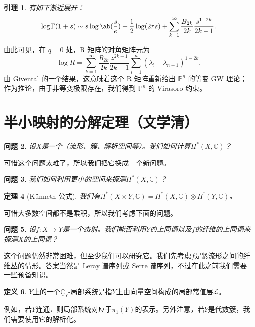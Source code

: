 \documentclass{amsart}
\newtheorem{thm}{定理}[section]
\newtheorem{lem}[thm]{引理}
\newtheorem{quest}[thm]{问题}
\theoremstyle{definition}
\newtheorem{defn}[thm]{定义}
\theoremstyle{remark}
\theoremstyle{plain}
\theoremstyle{definition}
\theoremstyle{remark}
\newcommand{\C}{\mathbb{C}}
\renewcommand{\P}{\mathbb{P}}
\newcommand{\mc}[1]{\mathcal{#1}}
\newcommand{\ul}[1]{\underline{#1}}
\newcommand{\1}{\mathbf{1}}
\newcommand{\2}{\mathbf{2}}
\newcommand{\3}{\mathbf{3}}
\begin{document}
\begin{lem}
    有如下渐近展开：
    \[ \log \Gamma(1+s) \sim s \log \ab(\frac{s}{e}) + \frac{1}{2} \log(2\pi s) + \sum_{k=1}^{\infty} \frac{B_{2k}}{2k} \frac{s^{1-2k}}{2k-1}. \]
\end{lem}
由此可见，在 \(q = 0\) 处，R 矩阵的对角矩阵元为
\[ \log R = \sum_{k=1}^{\infty} \frac{B_{2k}}{2k} \frac{z^{2k-1}}{2k-1} \sum_{i =1}^n (\lambda_i - \lambda_{n+1})^{1-2k}. \]
由 Givental 的一个结果，这意味着这个 R 矩阵重新给出 \(\P^n\) 的等变 GW 理论；作为推论，由于非等变极限存在，我们得到 \(\P^n\) 的 Virasoro 约束。


\section{半小映射的分解定理（文学清）}%
\label{sec:Decomposition theorem for semi-small maps (Xueqing Wen)}

\begin{quest}
    设\(X\)是一个（流形、簇、解析空间等）。我们如何计算\(H^*(X, \C)\)？
\end{quest}

可惜这个问题太难了，所以我们把它换成一个新问题。

\begin{quest}
    我们如何利用更小的空间来探测\(H^*(X, \C)\)？
\end{quest}

\begin{thm}[K\"unneth 公式]
    我们有\(H^*(X \times Y, \C) = H^*(X, \C) \otimes H^*(Y, \C)\)。
\end{thm}

可惜大多数空间都不是乘积，所以我们考虑下面的问题。

\begin{quest}
    设\(f \colon X \to Y\)是一个态射。我们能否利用\(Y\)的上同调以及\(f\)的纤维的上同调来探测\(X\)的上同调？
\end{quest}

这个问题仍然非常困难，但至少我们可以研究它。我们先考虑\(f\)是紧流形之间的纤维丛的情形。答案当然是 Leray 谱序列或 Serre 谱序列，不过在此之前我们需要一些预备知识。

\begin{defn}
    \(Y\)上的一个\(\ul{\C}_Y\)-局部系统是指\(Y\)上由向量空间构成的局部常值层\(\mc{L}\)。
\end{defn}

例如，若\(Y\)连通，则局部系统对应于\(\pi_1(Y)\)的表示。另外注意，若\(Y\)是代数簇，我们需要使用它的解析化。
\end{document}
